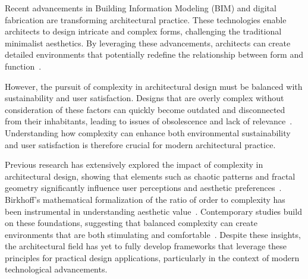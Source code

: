 




Recent advancements in Building Information Modeling (BIM) and digital fabrication are transforming architectural practice.
These technologies enable architects to design intricate and complex forms, challenging the traditional minimalist aesthetics.
By leveraging these advancements, architects can create detailed environments that potentially redefine the relationship between form and function~\cite{Gage2015}.

However, the pursuit of complexity in architectural design must be balanced with sustainability and user satisfaction.
Designs that are overly complex without consideration of these factors can quickly become outdated and disconnected from their inhabitants, leading to issues of obsolescence and lack of relevance~\cite{Aesthetic2022}.
Understanding how complexity can enhance both environmental sustainability and user satisfaction is therefore crucial for modern architectural practice.


Previous research has extensively explored the impact of complexity in architectural design, showing that elements such as chaotic patterns and fractal geometry significantly influence user perceptions and aesthetic preferences~\cite{Bies2016}.
Birkhoff's mathematical formalization of the ratio of order to complexity has been instrumental in understanding aesthetic value~\cite{Birkhoff1933}.
Contemporary studies build on these foundations, suggesting that balanced complexity can create environments that are both stimulating and comfortable~\cite{Redies2015}.
Despite these insights, the architectural field has yet to fully develop frameworks that leverage these principles for practical design applications, particularly in the context of modern technological advancements.

